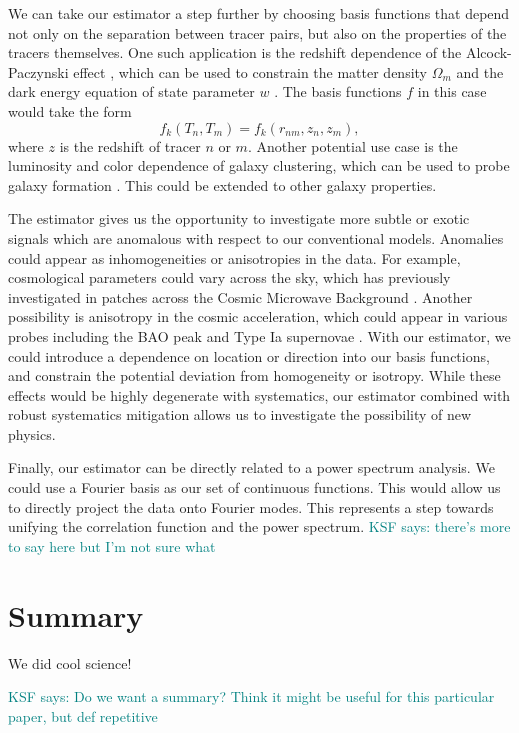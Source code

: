\documentclass[modern]{aastex62}
\newcommand{\KSF}[1]{\textcolor{teal}{KSF says: #1}}
\begin{document}
We can take our estimator a step further by choosing basis functions that depend not only on the separation between tracer pairs, but also on the properties of the tracers themselves.
One such application is the redshift dependence of the Alcock-Paczynski effect \cite{AlcockPaczynski1979}, which can be used to constrain the matter density $\Omega_m$ and the dark energy equation of state parameter $w$ \citep{Li2016}.
The basis functions $f$ in this case would take the form
\begin{equation}
    f_k(T_n, T_m) = f_k(r_{nm}, z_n, z_m),
\end{equation}
where $z$ is the redshift of tracer $n$ or $m$.
Another potential use case is the luminosity and color dependence of galaxy clustering, which can be used to probe galaxy formation \citep{Zehavi2011}.
This could be extended to other galaxy properties.

The estimator gives us the opportunity to investigate more subtle or exotic signals which are anomalous with respect to our conventional models.
Anomalies could appear as inhomogeneities or anisotropies in the data.
For example, cosmological parameters could vary across the sky, which has previously investigated in patches across the Cosmic Microwave Background \citep{MukherjeeWandelt2018}.
Another possibility is anisotropy in the cosmic acceleration, which could appear in various probes including the BAO peak \citep{Faltenbacher2012} and Type Ia supernovae \citep{Colin2019}.
With our estimator, we could introduce a dependence on location or direction into our basis functions, and constrain the potential deviation from homogeneity or isotropy.
While these effects would be highly degenerate with systematics, our estimator combined with robust systematics mitigation allows us to investigate the possibility of new physics.

Finally, our estimator can be directly related to a power spectrum analysis.
We could use a Fourier basis as our set of continuous functions.
This would allow us to directly project the data onto Fourier modes.
This represents a step towards unifying the correlation function and the power spectrum. \KSF{there's more to say here but I'm not sure what}


\section{Summary}

We did cool science!

\KSF{Do we want a summary? Think it might be useful for this particular paper, but def repetitive}
\end{document}

